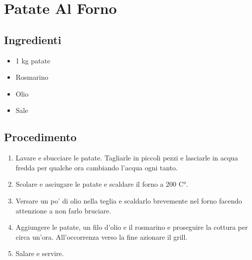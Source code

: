 \section{Patate Al Forno}
\subsection{Ingredienti}
\begin{itemize}
\item 1 kg patate  
\item Rosmarino  
\item Olio  
\item Sale
\end{itemize}
\subsection{Procedimento}
\begin{enumerate}
\item  Lavare e sbucciare le patate. Tagliarle in piccoli pezzi e lasciarle in acqua fredda per qualche ora cambiando l'acqua ogni tanto.  
\item  Scolare e asciugare le patate e scaldare il forno a 200 C°.  
\item  Versare un po' di olio nella teglia e scaldarlo brevemente nel forno facendo attenzione a non farlo bruciare.  
\item  Aggiungere le patate, un filo d'olio e il rosmarino e proseguire la cottura per circa un'ora. All'occorrenza verso la fine azionare il grill.  
\item  Salare e servire.
\end{enumerate}
